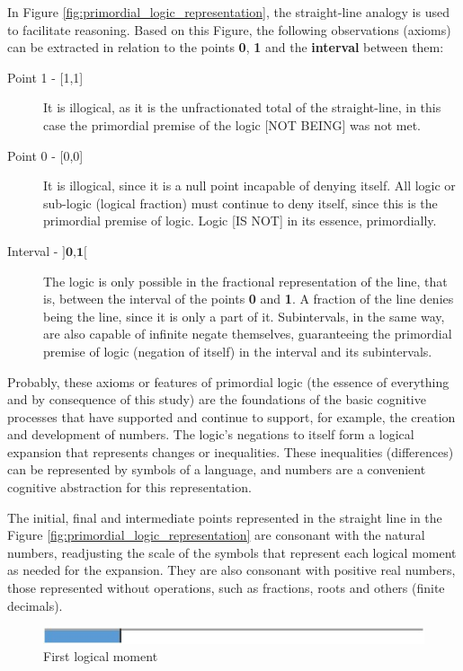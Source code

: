 In Figure \ref{fig:primordial_logic_representation}, the straight-line analogy is used to facilitate reasoning. Based on this Figure, the following observations (axioms) can be extracted in relation to the points \textbf {0}, \textbf {1} and the \textbf{interval} between them:
	\begin{description}
	   \item[Point 1 - {[1,1]}] It is illogical, as it is the unfractionated total of the straight-line, in this case the primordial premise of the logic [NOT BEING] was not met. 
	   \item[Point 0 - {[0,0]}] It is illogical, since it is a null point incapable of denying itself. All logic or sub-logic (logical fraction) must continue to deny itself, since this is the primordial premise of logic. Logic [IS NOT] in its essence, primordially.
	   \item[Interval - $\textbf{{]0,1[}}$] The logic is only possible in the fractional representation of the line, that is, between the interval of the points \textbf{0} and \textbf{1}. A fraction of the line denies being the line, since it is only a part of it. Subintervals, in the same way, are also capable of infinite negate themselves, guaranteeing the primordial premise of logic (negation of itself) in the interval and its subintervals.
	\end{description}

Probably, these axioms or features of primordial logic (the essence of everything and by consequence of this study) are the foundations of the basic cognitive processes that have supported and continue to support, for example, the creation and development of numbers. The logic's negations to itself form a logical expansion that represents changes or inequalities. These inequalities (differences) can be represented by symbols of a language, and numbers are a convenient cognitive abstraction for this representation.

The initial, final and intermediate points represented in the straight line in the Figure \ref{fig:primordial_logic_representation} are consonant with the natural numbers, readjusting the scale of the symbols that represent each logical moment as needed for the expansion. They are also consonant with positive real numbers, those represented without operations, such as fractions, roots and others (finite decimals).
	\begin{figure}[H]
	\caption{First logical moment}
	\label{fig:first_logical_moment}
	\centering
	\includegraphics[scale=.87]{sections/images/first_logical_moment.jpg}
	\end{figure}

